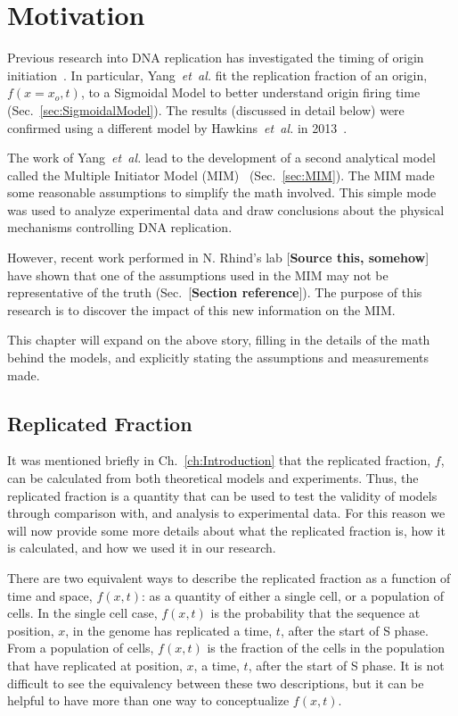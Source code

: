 \chapter{Motivation}
\label{ch:Motivation}

Previous research into DNA replication has investigated the timing of origin initiation~\cite{ScottsPaper,Bechhoefer2012374,deMouraModel1,deMouraModel2,StochasticTermination}.
In particular, Yang~\emph{et~al.} fit the replication fraction of an origin, $f(x=x_o,t)$, to a Sigmoidal Model to better understand origin firing time~\cite{ScottsPaper} (Sec.~\ref{sec:SigmoidalModel}).
The results (discussed in detail below) were confirmed using a different model by Hawkins~\emph{et~al.} in 2013~\cite{StochasticTermination}.

The work of Yang~\emph{et~al.} lead to the development of a second analytical model called the Multiple Initiator Model (MIM)~\cite{ScottsPaper} (Sec.~\ref{sec:MIM}).
The MIM made some reasonable assumptions to simplify the math involved.
This simple mode was used to analyze experimental data and draw conclusions about the physical mechanisms controlling DNA replication.

However, recent work performed in N. Rhind's lab [\textbf{Source this, somehow}] have shown that one of the assumptions used in the MIM may not be representative of the truth (Sec.~[\textbf{Section reference}]).
The purpose of this research is to discover the impact of this new information on the MIM.

This chapter will expand on the above story, filling in the details of the math behind the models, and explicitly stating the assumptions and measurements made.


	\section{Replicated Fraction}
	\label{sec:ReplicatedFraction}
	
	It was mentioned briefly in Ch.~\ref{ch:Introduction} that the replicated fraction, $f$, can be calculated from both theoretical models and experiments.
	Thus, the replicated fraction is a quantity that can be used to test the validity of models through comparison with, and analysis to experimental data.
	For this reason we will now provide some more details about what the replicated fraction is, how it is calculated, and how we used it in our research.
	
	There are two equivalent ways to describe the replicated fraction as a function of time and space, $f(x,t)$:
	as a quantity of either a single cell, or a population of cells.
	In the single cell case, $f(x,t)$ is the probability that the sequence at position, $x$, in the genome has replicated a time, $t$, after the start of S phase.
	From a population of cells, $f(x,t)$ is the fraction of the cells in the population that have replicated at position, $x$, a time, $t$, after the start of S phase.
	It is not difficult to see the equivalency between these two descriptions, but it can be helpful to have more than one way to conceptualize $f(x,t)$.
	
